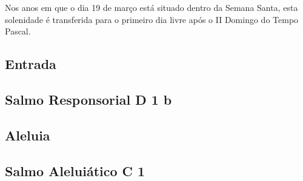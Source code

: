 
\begin{rubrica}
  Nos anos em que o dia 19 de março está situado dentro da Semana Santa, esta solenidade é transferida para o primeiro dia livre após o II Domingo do Tempo Pascal.
\end{rubrica}

\subsection{Entrada}\label{subsection:proprium-sanctorum/sancti-ioseph-sponsi-bmv/introitus}

\AllowPageFlush

\subsection{Salmo Responsorial \textmd{D 1 b}}\label{subsection:proprium-sanctorum/sancti-ioseph-sponsi-bmv/psalmus-responsorius}

\AllowPageFlush

\subsection{Aleluia}\label{subsection:proprium-sanctorum/sancti-ioseph-sponsi-bmv/alleluia}

\AllowPageFlush

\subsection[Salmo Aleluiático]{Salmo Aleluiático \textmd{C 1}}\label{subsection:proprium-sanctorum/sancti-ioseph-sponsi-bmv/psalmus-alleluiaticus}

\AllowPageFlush



